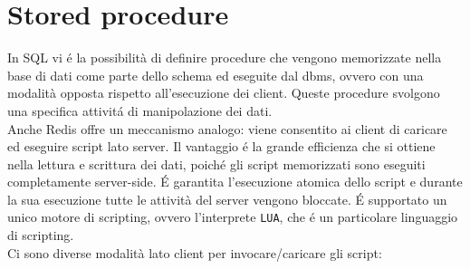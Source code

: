 \section{Stored procedure}
In SQL vi é la possibilità di definire procedure che vengono memorizzate nella base di dati come parte dello schema ed eseguite dal dbms,
ovvero con una modalità opposta rispetto all'esecuzione dei client. Queste procedure svolgono una specifica attivitá di manipolazione dei dati.\\
Anche Redis offre un meccanismo analogo: viene consentito ai client di caricare ed eseguire script lato server.
Il vantaggio é la grande efficienza che si ottiene nella lettura e scrittura dei dati, poiché gli script
memorizzati sono eseguiti completamente server-side.
É garantita l'esecuzione atomica dello script e durante la sua esecuzione tutte le attività del server vengono bloccate.
É supportato un unico motore di scripting, ovvero l'interprete \texttt{LUA}, che é un particolare linguaggio di scripting.
\\
Ci sono diverse modalità lato client per invocare/caricare gli script:
